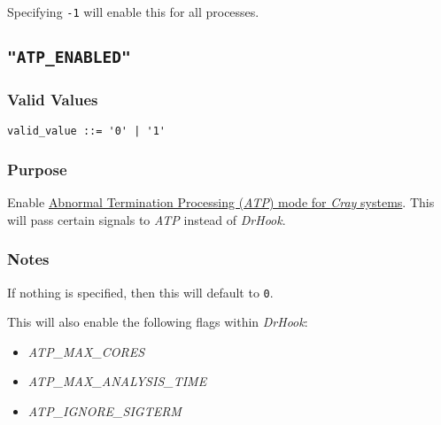 Specifying \verb|-1| will enable this for all processes.



\subsection{\texttt{"ATP\_ENABLED"}}
\label{section:flags:ATP_ENABLED}
\vspace{-2ex}
\subsubsection{Valid Values}
\vspace{-2ex}
\verb+valid_value ::= '0' | '1'+ 

\vspace{-2ex}
\subsubsection{Purpose}
\vspace{-2ex}
Enable \href{https://cpe.ext.hpe.com/docs/debugging-tools/atp.1.html}{Abnormal Termination Processing (\textit{ATP}) mode for \textit{Cray} systems}. This will pass certain signals to \textit{ATP} instead of \textit{DrHook}.

\vspace{-2ex}
\subsubsection{Notes}
\vspace{-2ex}
If nothing is specified, then this will default to \texttt{0}.

This will also enable the following flags within \textit{DrHook}:
\begin{itemize}
    \item \textit{ATP\_MAX\_CORES}
    \item \textit{ATP\_MAX\_ANALYSIS\_TIME}
    \item \textit{ATP\_IGNORE\_SIGTERM}
\end{itemize}

